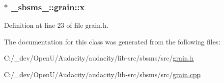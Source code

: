 \subsubsection[{\texorpdfstring{x}{x}}]{$\ast$ \+\_\+sbsms\+\_\+\+::grain\+::x}\hypertarget{class__sbsms___1_1grain_ad23cc1dc0b4f517bcc71338fc82b75a7}{}\label{class__sbsms___1_1grain_ad23cc1dc0b4f517bcc71338fc82b75a7}


Definition at line 23 of file grain.\+h.



The documentation for this class was generated from the following files\+:\begin{DoxyCompactItemize}
\item 
C\+:/\+\_\+dev/\+Open\+U/\+Audacity/audacity/lib-\/src/sbsms/src/\hyperlink{grain_8h}{grain.\+h}\item 
C\+:/\+\_\+dev/\+Open\+U/\+Audacity/audacity/lib-\/src/sbsms/src/\hyperlink{grain_8cpp}{grain.\+cpp}\end{DoxyCompactItemize}
